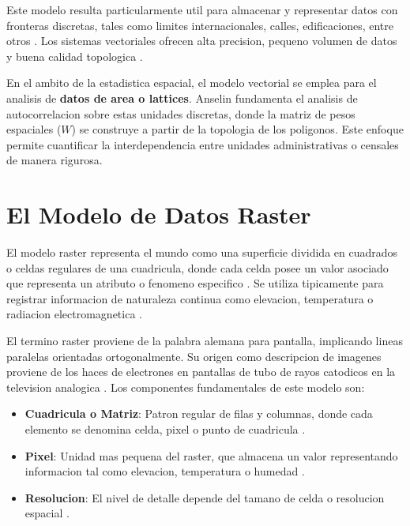 \documentclass[11pt,a4paper]{article}
\begin{document}
Este modelo resulta particularmente util para almacenar y representar datos con fronteras discretas, tales como limites internacionales, calles, edificaciones, entre otros \cite{das2022application}. Los sistemas vectoriales ofrecen alta precision, pequeno volumen de datos y buena calidad topologica \cite{yao2018big}.

En el ambito de la estadistica espacial, el modelo vectorial se emplea para el analisis de \textbf{datos de area o lattices}. Anselin \cite{anselin1988spatial} fundamenta el analisis de autocorrelacion sobre estas unidades discretas, donde la matriz de pesos espaciales ($W$) se construye a partir de la topologia de los poligonos. Este enfoque permite cuantificar la interdependencia entre unidades administrativas o censales de manera rigurosa.

\section{El Modelo de Datos Raster}

El modelo raster representa el mundo como una superficie dividida en cuadrados o celdas regulares de una cuadricula, donde cada celda posee un valor asociado que representa un atributo o fenomeno especifico \cite{giofandi2023comparison}. Se utiliza tipicamente para registrar informacion de naturaleza continua como elevacion, temperatura o radiacion electromagnetica \cite{pingel2018raster}.

El termino raster proviene de la palabra alemana para pantalla, implicando lineas paralelas orientadas ortogonalmente. Su origen como descripcion de imagenes proviene de los haces de electrones en pantallas de tubo de rayos catodicos en la television analogica \cite{pingel2018raster}. Los componentes fundamentales de este modelo son:

\begin{itemize}
    \item \textbf{Cuadricula o Matriz}: Patron regular de filas y columnas, donde cada elemento se denomina celda, pixel o punto de cuadricula \cite{pingel2018raster}.
    \item \textbf{Pixel}: Unidad mas pequena del raster, que almacena un valor representando informacion tal como elevacion, temperatura o humedad \cite{bajjali2017working}.
    \item \textbf{Resolucion}: El nivel de detalle depende del tamano de celda o resolucion espacial \cite{bajjali2017working}.
\end{itemize}
\end{document}
